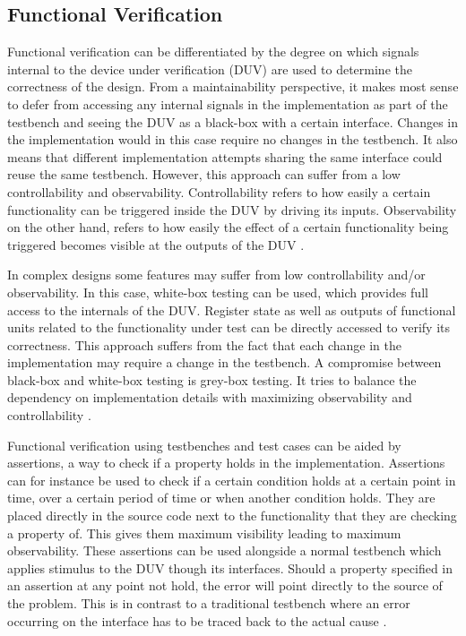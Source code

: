 \subsection{Functional Verification} %


Functional verification can be differentiated by the degree on which signals internal to the device under
verification (DUV) are used to determine the correctness of the design. From a maintainability perspective, it makes
most sense to defer from accessing any internal signals in the implementation as part of the testbench and seeing the
DUV as a black-box with a certain interface. Changes in the implementation would in this case require no changes in
the testbench. It also means that different implementation attempts sharing the same interface could reuse the same
testbench. However, this approach can suffer from a low controllability and observability. Controllability refers to
how easily a certain functionality can be triggered inside the DUV by driving its inputs. Observability on the other
hand, refers to how easily the effect of a certain functionality being triggered becomes visible at the outputs of
the DUV \cite[Ch. 1]{bergeron2012writing}.

In complex designs some features may suffer from low controllability and/or observability. In this case, white-box
testing can be used, which provides full access to the internals of the DUV. Register state as well as outputs of
functional units related to the functionality under test can be directly accessed to verify its correctness. This
approach suffers from the fact that each change in the implementation may require a change in the testbench. A
compromise between black-box and white-box testing is grey-box testing. It tries to balance the dependency on
implementation details with maximizing observability and controllability \cite[Ch. 1]{bergeron2012writing}.

Functional verification using testbenches and test cases can be aided by assertions, a way to check if a property
holds in the implementation. Assertions can for instance be used to check if a certain condition holds at a certain
point in time, over a certain period of time or when another condition holds. They are placed directly in the source
code next to the functionality that they are checking a property of. This gives them maximum visibility leading to
maximum observability. These assertions can be used alongside a normal testbench which applies stimulus to the DUV
though its interfaces. Should a property specified in an assertion at any point not hold, the error will point
directly to the source of the problem. This is in contrast to a traditional testbench where an error occurring on the
interface has to be traced back to the actual cause \cite[Ch. 14]{mehta2021introduction}.

